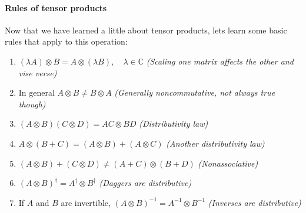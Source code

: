 \documentclass[12pt]{article}
\theoremstyle{plain}
\theoremstyle{nonumberplain}
\theoremstyle{plain}
\theoremstyle{nonumberplain}
\newcommand\1{{\bf 1}}
\newcommand{\C}{\mathbb{C}} %
\newcommand{\<}{\left\langle}
\renewcommand{\>}{\right\rangle}
\begin{document}
\paragraph{Rules of tensor products} Now that we have learned a little about tensor products, lets learn some basic rules that apply to this operation:
\begin{enumerate}
\label{def:rule} \item  $(\lambda A) \otimes B = A \otimes (\lambda B), \quad \lambda \in \C$ \textit{(Scaling one matrix affects the other and vise verse)}
\item In general $A \otimes B \neq B \otimes A$ \textit{(Generally noncommutative, not always true though)} 
\item $(A \otimes B)(C \otimes D) = AC \otimes BD$ \textit{(Distributivity law)}
\item $A \otimes (B + C) = (A \otimes B) + (A \otimes C)$ \textit{(Another distributivity law)}
\item $(A \otimes B) + (C \otimes D) \neq (A + C) \otimes (B + D)$ \textit{(Nonassociative)}
\item $(A \otimes B)^\dagger = A^\dagger \otimes B^\dagger$ \textit{(Daggers are distributive)}
\item If $A$ and $B$ are invertible, $(A \otimes B)^{-1} = A^{-1} \otimes B^{-1}$ \textit{(Inverses are distributive)}
\end{enumerate}

\pagebreak
\end{document}
